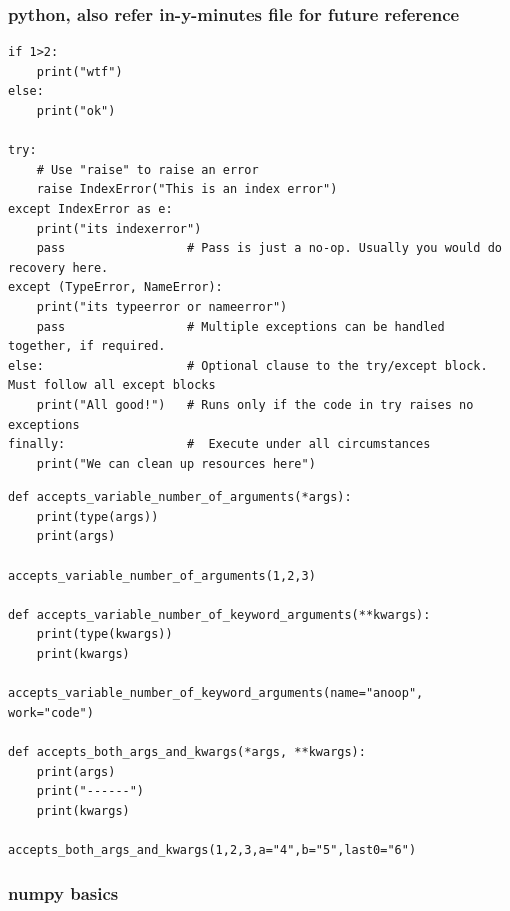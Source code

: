 \documentclass[11pt]{article}
\begin{document}
\subsubsection{python, also refer in-y-minutes file for future reference}
\label{sec:orgb17536d}
\begin{verbatim}
if 1>2:
    print("wtf")
else:
    print("ok")

try:
    # Use "raise" to raise an error
    raise IndexError("This is an index error")
except IndexError as e:
    print("its indexerror")
    pass                 # Pass is just a no-op. Usually you would do recovery here.
except (TypeError, NameError):
    print("its typeerror or nameerror")
    pass                 # Multiple exceptions can be handled together, if required.
else:                    # Optional clause to the try/except block. Must follow all except blocks
    print("All good!")   # Runs only if the code in try raises no exceptions
finally:                 #  Execute under all circumstances
    print("We can clean up resources here")
\end{verbatim}

\begin{verbatim}
def accepts_variable_number_of_arguments(*args):
    print(type(args))
    print(args)

accepts_variable_number_of_arguments(1,2,3)

def accepts_variable_number_of_keyword_arguments(**kwargs):
    print(type(kwargs))
    print(kwargs)

accepts_variable_number_of_keyword_arguments(name="anoop", work="code")

def accepts_both_args_and_kwargs(*args, **kwargs):
    print(args)
    print("------")
    print(kwargs)

accepts_both_args_and_kwargs(1,2,3,a="4",b="5",last0="6")
\end{verbatim}

\subsubsection{numpy basics}
\label{sec:orgef175d3}
\end{document}

